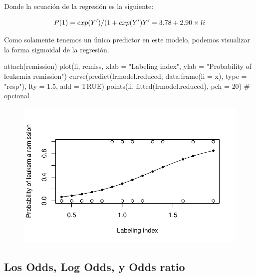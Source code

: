 \documentclass[
  letterpaper,
  DIV=11,
  numbers=noendperiod]{scrartcl}
\newenvironment{Shaded}{\begin{snugshade}}{\end{snugshade}}
\newcommand{\AttributeTok}[1]{\textcolor[rgb]{0.40,0.45,0.13}{#1}}
\newcommand{\CommentTok}[1]{\textcolor[rgb]{0.37,0.37,0.37}{#1}}
\newcommand{\ConstantTok}[1]{\textcolor[rgb]{0.56,0.35,0.01}{#1}}
\newcommand{\DecValTok}[1]{\textcolor[rgb]{0.68,0.00,0.00}{#1}}
\newcommand{\FloatTok}[1]{\textcolor[rgb]{0.68,0.00,0.00}{#1}}
\newcommand{\FunctionTok}[1]{\textcolor[rgb]{0.28,0.35,0.67}{#1}}
\newcommand{\NormalTok}[1]{\textcolor[rgb]{0.00,0.23,0.31}{#1}}
\newcommand{\StringTok}[1]{\textcolor[rgb]{0.13,0.47,0.30}{#1}}
\begin{document}
Donde la ecuación de la regresión es la siguiente:

\[
P(1) = exp(Y')/(1+exp(Y') \\
Y' = 3.78+2.90\times li
\]

Como solamente tenemos un único predictor en este modelo, podemos
visualizar la forma sigmoidal de la regresión.

\begin{Shaded}
\begin{Highlighting}[]
\FunctionTok{attach}\NormalTok{(remission)}
\FunctionTok{plot}\NormalTok{(li, remiss, }\AttributeTok{xlab =} \StringTok{"Labeling index"}\NormalTok{, }\AttributeTok{ylab =} \StringTok{"Probability of leukemia remission"}\NormalTok{)}
\FunctionTok{curve}\NormalTok{(}\FunctionTok{predict}\NormalTok{(lrmodel.reduced, }\FunctionTok{data.frame}\NormalTok{(}\AttributeTok{li =}\NormalTok{ x), }\AttributeTok{type =} \StringTok{"resp"}\NormalTok{),}
      \AttributeTok{lty =} \FloatTok{1.5}\NormalTok{,}
      \AttributeTok{add =} \ConstantTok{TRUE}\NormalTok{)}
\FunctionTok{points}\NormalTok{(li, }\FunctionTok{fitted}\NormalTok{(lrmodel.reduced), }\AttributeTok{pch =} \DecValTok{20}\NormalTok{) }\CommentTok{\# opcional}
\end{Highlighting}
\end{Shaded}

\begin{figure}[H]

{\centering \includegraphics{Metodos_Clasificacion_files/figure-pdf/unnamed-chunk-6-1.pdf}

}

\end{figure}

\hypertarget{los-odds-log-odds-y-odds-ratio}{%
\subsection{Los Odds, Log Odds, y Odds
ratio}\label{los-odds-log-odds-y-odds-ratio}}
\end{document}
